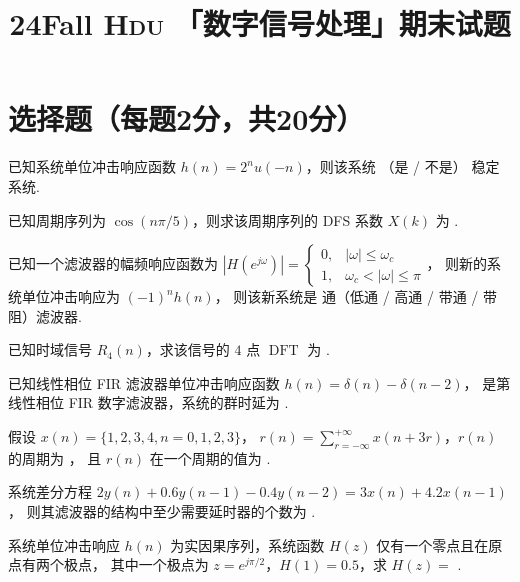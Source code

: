 \documentclass[quiet]{ctexart}
\title{\sffamily\bfseries 24Fall \textsc{Hdu} 「数字信号处理」期末试题}
\author{} \date{}
\DeclareMathOperator{\DFT}{DFT}
\begin{document}
\maketitle

\section{选择题（每题2分，共20分）}

\begin{problem}
  已知系统单位冲击响应函数 $h(n) = 2^nu(-n)$，则该系统 \result{}（是 / 不是） 稳定系统.
\end{problem}

\begin{problem}
  已知周期序列为 $\cos(n\pi/5)$，则求该周期序列的 DFS 系数 $X(k)$ 为 \result{}.
\end{problem}

\begin{problem}
  已知一个滤波器的幅频响应函数为
  $|H(e^{j\omega})| =
  \begin{cases}
    0, & |\omega| \leq \omega_c\\
    1, & \omega_c < |\omega| \leq \pi
  \end{cases}$，
  则新的系统单位冲击响应为 $(-1)^nh(n)$，
  则该新系统是 \result{} 通（低通 / 高通 / 带通 / 带阻）滤波器.
\end{problem}

\begin{problem}
  已知时域信号 $R_4(n)$，求该信号的 $4$ 点 $\DFT$ 为 \result{}.
\end{problem}

\begin{problem}
  已知线性相位 FIR 滤波器单位冲击响应函数 $h(n) = \delta(n) - \delta(n - 2)$，
  是第 \result{} 线性相位 FIR 数字滤波器，系统的群时延为 \result{}.
\end{problem}

\begin{problem}
  假设 $x(n) = \{1,2,3,4,n = 0,1,2,3\}$，
  $r(n) = \sum_{r = -\infty}^{+\infty} x(n + 3r)$，$r(n)$ 的周期为 \result{}，
  且 $r(n)$ 在一个周期的值为 \result{}.
\end{problem}

\begin{problem}
  系统差分方程 $2y(n) + 0.6y(n - 1) - 0.4y(n - 2) = 3x(n) + 4.2x(n - 1)$，
  则其滤波器的结构中至少需要延时器的个数为 \result{}.
\end{problem}

\begin{problem}
  系统单位冲击响应 $h(n)$ 为实因果序列，系统函数 $H(z)$ 仅有一个零点且在原点有两个极点，
  其中一个极点为 $z = e^{j\pi/2}$，$H(1) = 0.5$，求 $H(z) =$ \result{}.
\end{problem}
\end{document}
